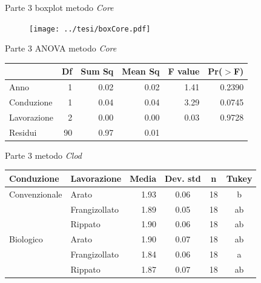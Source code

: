 \documentclass[10pt]{beamer}
\begin{document}
\begin{frame}
\end{frame}


\begin{frame}{Parte 3 \small{boxplot metodo \emph{Core}}}
  
  \begin{figure}
    \texttt{[image: ../tesi/boxCore.pdf]}
  \end{figure}
\end{frame}

\begin{frame}{Parte 3 \small{ ANOVA metodo  \emph{Core}} }
  \begin{table}[ht]
    \centering
    \label{tab:anova del modello}
    \begin{tabular}{lrrrrr}
      \hline
                   & Df & Sum Sq & Mean Sq & F value & Pr($>$F) \\ 
      \hline 
      Anno         & 1  &  0.02  &  0.02  &   1.41   & 0.2390   \\ 
      Conduzione   & 1  &  0.04  &  0.04  &   3.29   & 0.0745   \\ 
      Lavorazione  & 2  &  0.00  &  0.00  &   0.03   & 0.9728   \\ 
      Residui      & 90 &  0.97  &  0.01  &          &          \\ 
      \hline
    \end{tabular}
  \end{table}
\end{frame}

\begin{frame}[label=Clod]{Parte 3 \small{ metodo \emph{Clod}}}
  \hyperlink{finale}{}
  \footnotesize
  \begin{table}[ht]
    \centering
    \begin{tabular}{llrccc}
      \hline
      Conduzione    & Lavorazione   & Media& Dev. std & n    & Tukey \\ 
      \hline
      Convenzionale & Arato         & 1.93 & 0.06      &  18 & b     \\ 
                    & Frangizollato & 1.89 & 0.05      &  18 & ab    \\ 
                    & Rippato       & 1.90 & 0.06      &  18 & ab    \\ 
      Biologico     & Arato         & 1.90 & 0.07      &  18 & ab    \\ 
                    & Frangizollato & 1.84 & 0.06      &  18 & a     \\ 
                    & Rippato       & 1.87 & 0.07      &  18 & ab    \\ 
      \hline
    \end{tabular}
    \label{tab:RiassuntoDensitaSpinta}
  \end{table}
\end{frame}
\end{document}
